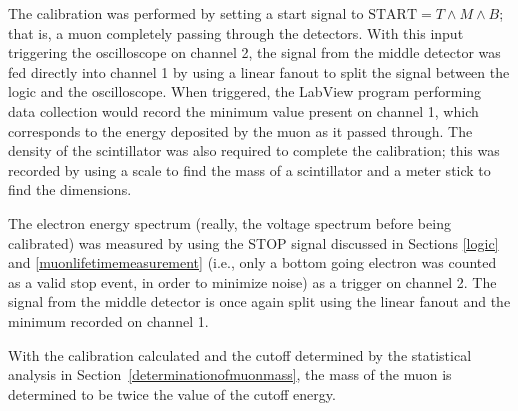 The calibration was performed by setting a start signal to $\mathrm{START} = T \wedge M \wedge B$; that is, a muon completely passing through the detectors. With this input triggering the oscilloscope on channel 2, the signal from the middle detector was fed directly into channel 1 by using a linear fanout to split the signal between the logic and the oscilloscope. When triggered, the LabView program performing data collection would record the minimum value present on channel 1, which corresponds to the energy deposited by the muon as it passed through. The density of the scintillator was also required to complete the calibration; this was recorded by using a scale to find the mass of a scintillator and a meter stick to find the dimensions.

The electron energy spectrum (really, the voltage spectrum before being calibrated) was measured by using the STOP signal discussed in Sections \ref{logic} and \ref{muonlifetimemeasurement} (i.e., only a bottom going electron was counted as a valid stop event, in order to minimize noise) as a trigger on channel 2. The signal from the middle detector is once again split using the linear fanout and the minimum recorded on channel 1. 

With the calibration calculated and the cutoff determined by the statistical analysis in Section~\ref{determinationofmuonmass}, the mass of the muon is determined to be twice the value of the cutoff energy.